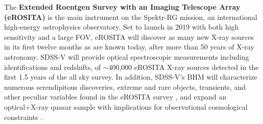 \begin{framed}
The {\bf Extended Roentgen Survey with an Imaging Telescope Array
(eROSITA)} is the main instrument on the Spektr-RG mission, an
international high-energy astrophysics observatory.  Set to launch in
2019 with both high sensitivity and a large FOV, eROSITA will discover
as many new X-ray sources in its first twelve months as are known
today, after more than 50 years of X-ray astronomy.  SDSS-V will
provide optical spectroscopic measurements including identifications
and redshifts, of $\sim$400,000 eROSITA X-ray sources detected in the
first 1.5 years of the all sky survey.  In addition, SDSS-V's BHM will
characterize numerous serendipitous discoveries, extreme and rare
objects, transients, and other peculiar variables found in the eROSITA
survey \citep{Merloni2012}, and expand an optical+X-ray quasar sample
with implications for observational cosmological constraints
\citep[e.g.][]{Risaliti_Lusso2015}.\\


\end{framed}
